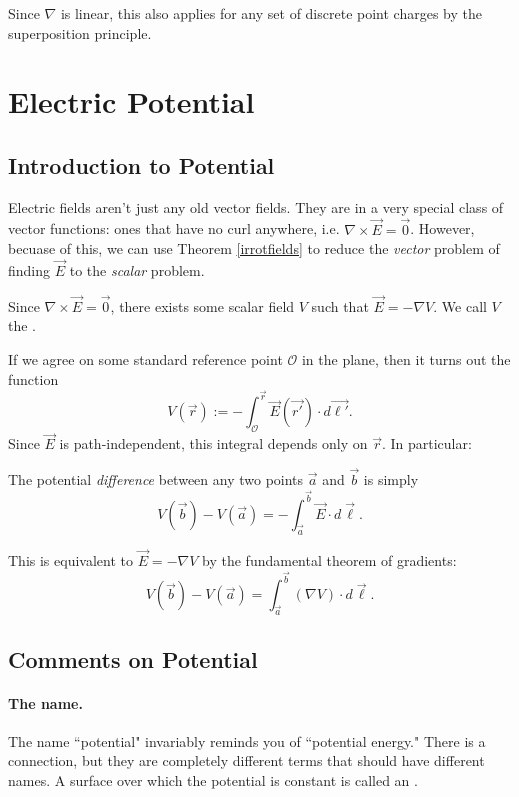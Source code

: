 Since $\nabla$ is linear, this also applies for any set of discrete point charges by the superposition principle.

\section{Electric Potential}

\subsection{Introduction to Potential}

Electric fields aren't just any old vector fields. They are in a very special class of vector functions: ones that have no curl anywhere, i.e. $\nabla\times\vec{E}=\vec{0}$. However, becuase of this, we can use Theorem \ref{irrotfields} to reduce the \textit{vector} problem of finding $\vec{E}$ to the \textit{scalar} problem.

\begin{definition}
Since $\nabla\times\vec{E}=\vec{0}$, there exists some scalar field $V$ such that $\vec{E}=-\nabla V$. We call $V$ the . 
\end{definition}

If we agree on some standard reference point $\mathcal{O}$ in the plane, then it turns out the function
\[V(\vec{r}):=-\int_{\mathcal{O}}^{\vec{r}} \vec{E}(\vec{r'})\cdot d\vec{\ell'}.\]
Since $\vec{E}$ is path-independent, this integral depends only on $\vec{r}$. In particular:

\begin{proposition}
The potential \textit{difference} between any two points $\vec{a}$ and $\vec{b}$ is simply
\[V(\vec{b})-V(\vec{a})=-\int_{\vec{a}}^{\vec{b}}\vec{E}\cdot d\vec{\ell}.\]
\end{proposition}

This is equivalent to $\vec{E}=-\nabla V$ by the fundamental theorem of gradients:
\[V(\vec{b})-V(\vec{a})=\int_{\vec{a}}^{\vec{b}}(\nabla V)\cdot d\vec{\ell}.\]

\subsection{Comments on Potential}

\paragraph{The name.} The name ``potential" invariably reminds you of ``potential energy." There is a connection, but they are completely different terms that should have different names. A surface over which the potential is constant is called an .

